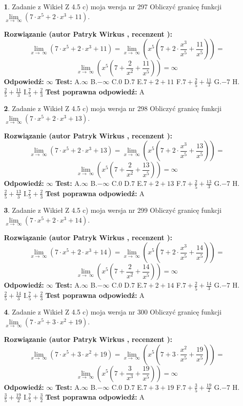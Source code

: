 \documentclass[12pt, a4paper]{article}
\theoremstyle{definition} %
\newtheorem{zad}{}
\newcommand{\zadStart}[1]{\begin{zad}#1\newline}
\newcommand{\zadStop}{\end{zad}}
\newcommand{\rozwStart}[2]{\noindent \textbf{Rozwiązanie (autor #1 , recenzent #2): }\newline}
\newcommand{\rozwStop}{\newline}
\newcommand{\odpStart}{\noindent \textbf{Odpowiedź:}\newline}
\newcommand{\odpStop}{\newline}
\newcommand{\testStart}{\noindent \textbf{Test:}\newline}
\newcommand{\testStop}{\newline}
\newcommand{\kluczStart}{\noindent \textbf{Test poprawna odpowiedź:}\newline}
\newcommand{\kluczStop}{\newline}
\begin{document}
\zadStart{Zadanie z Wikieł Z 4.5 c) moja wersja nr 297}
Obliczyć granicę funkcji  $\lim\limits_{x\to\ \infty}(7 \cdot x^{5}+2 \cdot x^{3}+11)$.
\zadStop
\rozwStart{Patryk Wirkus}{}
$$\lim\limits_{x\to\ \infty}(7 \cdot x^{5}+2 \cdot x^{3}+11) = \lim\limits_{x\to\ \infty}(x^{5}(7 +2 \cdot \frac{x^{3}}{x^{5}}+\frac{11}{x^{5}})) =$$ $$\lim\limits_{x\to\ \infty}(x^{5}(7 +\frac{2}{x^{2}}+\frac{11}{x^{5}})) =\infty$$
\rozwStop
\odpStart
$\infty$
\odpStop
\testStart
A.$\infty$ B.$-\infty$ C.$0$ D.$7$ E.$7 + 2 + 11$
F.$7+\frac{2}{5}+\frac{11}{3}$ G.$-7$
H.$\frac{2}{5}+\frac{11}{3}$
I.$\frac{7}{5}+\frac{2}{3}$
\testStop
\kluczStart
A
\kluczStop



\zadStart{Zadanie z Wikieł Z 4.5 c) moja wersja nr 298}
Obliczyć granicę funkcji  $\lim\limits_{x\to\ \infty}(7 \cdot x^{5}+2 \cdot x^{3}+13)$.
\zadStop
\rozwStart{Patryk Wirkus}{}
$$\lim\limits_{x\to\ \infty}(7 \cdot x^{5}+2 \cdot x^{3}+13) = \lim\limits_{x\to\ \infty}(x^{5}(7 +2 \cdot \frac{x^{3}}{x^{5}}+\frac{13}{x^{5}})) =$$ $$\lim\limits_{x\to\ \infty}(x^{5}(7 +\frac{2}{x^{2}}+\frac{13}{x^{5}})) =\infty$$
\rozwStop
\odpStart
$\infty$
\odpStop
\testStart
A.$\infty$ B.$-\infty$ C.$0$ D.$7$ E.$7 + 2 + 13$
F.$7+\frac{2}{5}+\frac{13}{3}$ G.$-7$
H.$\frac{2}{5}+\frac{13}{3}$
I.$\frac{7}{5}+\frac{2}{3}$
\testStop
\kluczStart
A
\kluczStop



\zadStart{Zadanie z Wikieł Z 4.5 c) moja wersja nr 299}
Obliczyć granicę funkcji  $\lim\limits_{x\to\ \infty}(7 \cdot x^{5}+2 \cdot x^{3}+14)$.
\zadStop
\rozwStart{Patryk Wirkus}{}
$$\lim\limits_{x\to\ \infty}(7 \cdot x^{5}+2 \cdot x^{3}+14) = \lim\limits_{x\to\ \infty}(x^{5}(7 +2 \cdot \frac{x^{3}}{x^{5}}+\frac{14}{x^{5}})) =$$ $$\lim\limits_{x\to\ \infty}(x^{5}(7 +\frac{2}{x^{2}}+\frac{14}{x^{5}})) =\infty$$
\rozwStop
\odpStart
$\infty$
\odpStop
\testStart
A.$\infty$ B.$-\infty$ C.$0$ D.$7$ E.$7 + 2 + 14$
F.$7+\frac{2}{5}+\frac{14}{3}$ G.$-7$
H.$\frac{2}{5}+\frac{14}{3}$
I.$\frac{7}{5}+\frac{2}{3}$
\testStop
\kluczStart
A
\kluczStop



\zadStart{Zadanie z Wikieł Z 4.5 c) moja wersja nr 300}
Obliczyć granicę funkcji  $\lim\limits_{x\to\ \infty}(7 \cdot x^{5}+3 \cdot x^{2}+19)$.
\zadStop
\rozwStart{Patryk Wirkus}{}
$$\lim\limits_{x\to\ \infty}(7 \cdot x^{5}+3 \cdot x^{2}+19) = \lim\limits_{x\to\ \infty}(x^{5}(7 +3 \cdot \frac{x^{2}}{x^{5}}+\frac{19}{x^{5}})) =$$ $$\lim\limits_{x\to\ \infty}(x^{5}(7 +\frac{3}{x^{3}}+\frac{19}{x^{5}})) =\infty$$
\rozwStop
\odpStart
$\infty$
\odpStop
\testStart
A.$\infty$ B.$-\infty$ C.$0$ D.$7$ E.$7 + 3 + 19$
F.$7+\frac{3}{5}+\frac{19}{2}$ G.$-7$
H.$\frac{3}{5}+\frac{19}{2}$
I.$\frac{7}{5}+\frac{3}{2}$
\testStop
\kluczStart
A
\kluczStop
\end{document}

